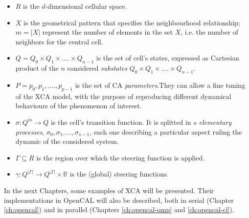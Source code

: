 \begin{itemize}

\item $R$ is the $d$-dimensional cellular space.

\item $X$ is the geometrical pattern that specifies the neighbourhood
  relationship; $m = |X|$ represent the number of elements in the set
  $X$, i.e. the number of neighbors for the central cell.

\item $Q = Q_0 \times Q_1 \times....\times Q_{n-1}$ is the set of
  cell's states, expressed as Cartesian product of the $n$ considered
  \emph{substates} $Q_0 \times Q_1 \times....\times Q_{n-1}$.

\item $P = {p_0,p_1,....,p_{p-1}}$ is the set of CA
  \emph{parameters}.They can allow a fine tuning of the XCA model,
  with the purpose of reproducing different dynamical behaviours of
  the phenomenon of interest.

\item $\sigma : Q^m \rightarrow Q$ is the cell's transition function.
 It is splitted in $s$ \emph{elementary processes}, $\sigma_0,\sigma_1, ...,
  \sigma_{s-1}$, each one describing a particular aspect ruling the
  dynamic of the considered system.

\item $\Gamma \subseteq R$ is the region  over which the steering
  function is applied.

\item $\gamma: Q^{|\Gamma|} \rightarrow Q^{|\Gamma|} \times
  \mathbb{R}$ is the (global) steering functions.

\end{itemize}

In the next Chapters, some examples of XCA will be presented. Their
implementations in OpenCAL will also be described, both in serial
(Chapter \ref{ch:opencal}) and in parallel (Chapters
\ref{ch:opencal-omp} and \ref{ch:opencal-cl}).

